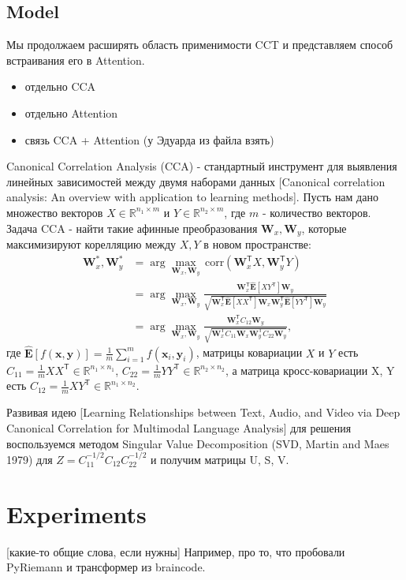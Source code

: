 \documentclass[a4paper,14pt]{article}
\newcommand{\bx}{\mathbf{x}}
\newcommand{\by}{\mathbf{y}}
\newcommand{\bW}{\mathbf{W}}
\newcommand{\bE}{\mathbf{E}}
\newcommand{\dR}{\mathbb{R}}
\newcommand{\T}{^{\mathsf{T}}}
\theoremstyle{plain} %
\theoremstyle{definition} %
\theoremstyle{remark} %
\begin{document}
        \subsection{Model}
        Мы продолжаем расширять область применимости CCT и представляем способ встраивания его в Attention.
        \begin{itemize}
            \item отдельно CCA
            \item отдельно Attention
            \item связь CCA + Attention (у Эдуарда из файла взять)
        \end{itemize}
        Canonical Correlation Analysis (CCA) - стандартный инструмент для выявления линейных зависимостей между двумя наборами данных [Canonical correlation analysis: An overview with application to learning methods]. Пусть нам дано множество векторов $X\in \dR^{n_1\times m}$ и $Y\in \dR^{n_2\times m}$, где $m$ - количество векторов. Задача CCA - найти такие афинные преобразования $\bW_x, \bW_y$, которые максимизируют корелляцию между $X, Y$ в новом пространстве:
        \begin{equation}
            \begin{aligned}
            \bW^{*}_x, \bW^{*}_y &= \arg\max_{\bW_x, \bW_y} \, \text{corr}(\bW_x\T X, \bW_y\T Y) \\
            &= \arg\max_{\bW_x, \bW_y}\frac{\bW_x\T \hat{\bE}[XY\T] \bW_y}{\sqrt{\bW_x\T \hat{\bE}[XX\T] \bW_x \bW_y\T \hat{\bE}[YY\T] \bW_y}} \\
            &= \arg\max_{\bW_x, \bW_y}\frac{\bW_x\T C_{12} \bW_y}{\sqrt{\bW_x\T C_{11} \bW_x \bW_y\T C_{22} \bW_y}},
            \end{aligned}
        \end{equation}
        где $\hat{\bE}[f(\bx, \by)] = \frac{1}{m}\sum\limits_{i=1}^{m}f(\bx_i, \by_i)$, матрицы ковариации $X$ и $Y$ есть $C_{11} = \frac{1}{m}XX\T \in \dR^{n_1\times n_1}$, $C_{22} = \frac{1}{m}YY\T \in \dR^{n_2\times n_2}$, а матрица кросс-ковариации X, Y есть $C_{12} = \frac{1}{m}XY\T \in\dR^{n_1\times n_2}$.

        Развивая идею [Learning Relationships between Text, Audio, and Video via Deep Canonical Correlation for Multimodal Language Analysis] для решения воспользуемся методом Singular Value Decomposition (SVD, Martin and Maes 1979) для $Z = C_{11}^{-1/2}C_{12}C_{22}^{-1/2}$ и получим матрицы U, S, V. 

        \section{Experiments}
        [какие-то общие слова, если нужны] Например, про то, что пробовали PyRiemann и трансформер из braincode.
\end{document}
